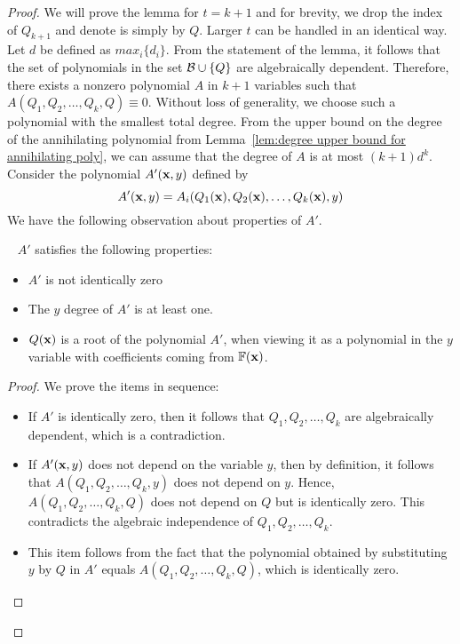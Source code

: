 \begin{proof}
We will prove the lemma for $t = k+1$ and for brevity, we drop the index of $Q_{k+1}$ and denote is simply by $Q$. Larger $t$ can be handled in an identical way. Let $d$ be defined as $max_i\{d_i\}$. From the statement of the lemma, 
it follows that the set of polynomials in the set ${\cal B} \cup \{Q\}$ are algebraically dependent. Therefore, there exists a nonzero polynomial $A$ in $k+1$ variables such that $A(Q_1, Q_2, \ldots, Q_k, Q) \equiv 0$. Without loss of generality, we choose such a polynomial with the smallest total degree. From the upper bound on the degree of the annihilating polynomial from Lemma~\ref{lem:degree upper bound for annihilating poly}, we can assume that the degree of $A$ is at most $(k+1)d^k$. Consider the polynomial $A'(\mathbf{x}, y)$ defined by $$A'(\mathbf{x}, y) = A_i(Q_1(\mathbf{x}), Q_2(\mathbf{x}), \ldots, Q_k(\mathbf{x}), y)$$
We have the following observation about properties of $A'$.
\begin{observation}~\label{obs:internal1}
$A'$ satisfies the following properties:
\begin{itemize}
\item $A'$ is not identically zero
\item The $y$ degree of $A'$ is at least one. 
\item $Q(\mathbf{x})$ is a root of the polynomial $A'$, when viewing it as a polynomial in the $y$ variable with coefficients coming from $\mathbb{F}(\mathbf{x})$. 
\end{itemize}
\end{observation}
\begin{proof}
We prove the items in sequence:
\begin{itemize}
\item If $A'$ is identically zero, then it follows that $Q_1, Q_2, \ldots, Q_k$ are algebraically dependent, which is a contradiction. 
\item If $A'(\mathbf{x} , y)$ does not depend on the variable $y$, then by definition, it follows that $A(Q_1, Q_2, \ldots, Q_k, y)$ does not depend on $y$. Hence, $A(Q_1, Q_2, \ldots, Q_k, Q)$ does not depend on $Q$ but is identically zero. This contradicts the algebraic independence of $Q_1, Q_2, \ldots, Q_k$.
\item This item follows from the fact that the polynomial obtained by substituting $y$ by $Q$ in $A'$ equals $A(Q_1, Q_2, \ldots, Q_k, Q)$, which is identically zero. 
\end{itemize}
\end{proof}


\end{proof}
